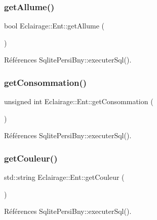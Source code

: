 \subsubsection{\texorpdfstring{get\+Allume()}{getAllume()}}
{\footnotesize\ttfamily bool Eclairage\+::\+Ent\+::get\+Allume (\begin{DoxyParamCaption}{ }\end{DoxyParamCaption})\hspace{0.3cm}{\ttfamily [virtual]}}



Références Sqlite\+Persi\+Bny\+::executer\+Sql().

\mbox{\label{classEclairage_1_1Ent_afb847965b5bcccc415bb169e500656f9}} 
\subsubsection{\texorpdfstring{get\+Consommation()}{getConsommation()}}
{\footnotesize\ttfamily unsigned int Eclairage\+::\+Ent\+::get\+Consommation (\begin{DoxyParamCaption}{ }\end{DoxyParamCaption})\hspace{0.3cm}{\ttfamily [virtual]}}



Références Sqlite\+Persi\+Bny\+::executer\+Sql().

\mbox{\label{classEclairage_1_1Ent_aab5bf5f43963b1d3918b06f1a8348c7e}} 
\subsubsection{\texorpdfstring{get\+Couleur()}{getCouleur()}}
{\footnotesize\ttfamily std\+::string Eclairage\+::\+Ent\+::get\+Couleur (\begin{DoxyParamCaption}{ }\end{DoxyParamCaption})\hspace{0.3cm}{\ttfamily [virtual]}}



Références Sqlite\+Persi\+Bny\+::executer\+Sql().

